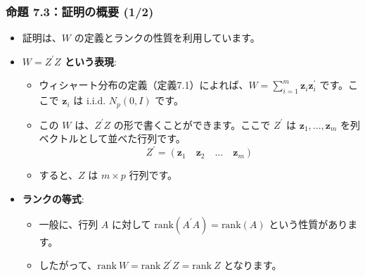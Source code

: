 \documentclass{beamer}
\begin{document}
\begin{frame}
\frametitle{命題 7.3：証明の概要 (1/2)}
\begin{itemize}
    \item 証明は、$W$ の定義とランクの性質を利用しています。
    \item \textbf{$W=Z^{\prime}Z$ という表現}:
    \begin{itemize}
        \item ウィシャート分布の定義（定義7.1）によれば、$W=\sum_{i=1}^{m}\bm{z}_{i}\bm{z}_{i}^{\prime}$ です。ここで $\bm{z}_i$ は i.i.d. $N_p(0,I)$ です。
        \item この $W$ は、$Z^{\prime}Z$ の形で書くことができます。ここで $Z^{\prime}$ は $\bm{z}_1,...,\bm{z}_m$ を列ベクトルとして並べた行列です。
        \[ Z^{\prime}=(\bm{z}_1\quad\bm{z}_2\quad\dots\quad\bm{z}_m) \]
        \item すると、$Z$ は $m \times p$ 行列です。
    \end{itemize}
    \item \textbf{ランクの等式}:
    \begin{itemize}
        \item 一般に、行列 $A$ に対して $\text{rank}(A^{\prime}A)=\text{rank}(A)$ という性質があります。
        \item したがって、$\text{rank}~W=\text{rank}~Z^{\prime}Z=\text{rank}~Z$ となります。
    \end{itemize}
\end{itemize}
\end{frame}
\end{document}
